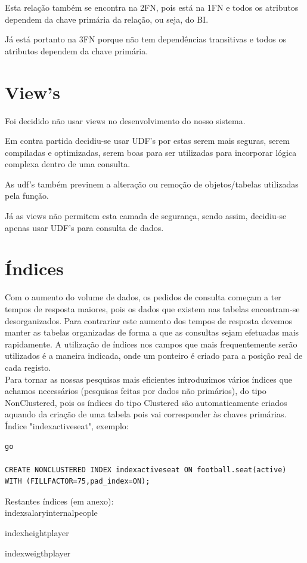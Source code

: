 \documentclass[pdftex,12pt,a4paper]{report}
\begin{document}
Esta relação também se encontra na 2FN, pois está na 1FN e todos os atributos dependem da chave primária da relação, ou seja, do BI.

Já está portanto na 3FN porque não tem dependências transitivas e todos os atributos dependem da chave primária.

\section{View's}
Foi decidido não usar views no desenvolvimento do nosso sistema. 

Em contra partida decidiu-se usar UDF's por estas serem mais seguras, serem compiladas e optimizadas, serem boas para ser utilizadas para incorporar lógica complexa dentro de uma consulta. 

As udf's também previnem a alteração ou remoção de objetos/tabelas utilizadas pela função.

Já as views não permitem esta camada de segurança, sendo assim, decidiu-se apenas usar UDF's para consulta de dados.

\newpage
\section{Índices}
Com o aumento do volume de dados, os pedidos de consulta começam a ter tempos de resposta maiores, pois os dados que existem nas tabelas encontram-se desorganizados. Para contrariar este aumento dos tempos de resposta devemos manter as tabelas organizadas de forma a que as consultas sejam efetuadas mais rapidamente. A utilização de índices nos campos que mais frequentemente serão utilizados é a maneira indicada, onde um ponteiro é criado para a posição real de cada registo.
\\

	Para tornar as nossas pesquisas mais eficientes introduzimos vários índices que achamos necessários (pesquisas feitas por dados não primários), do tipo NonClustered, pois os índices do tipo Clustered são automaticamente criados aquando da criação de uma tabela pois vai corresponder às chaves primárias.
\\

Índice "indexactiveseat", exemplo:
\\

\begin{lstlisting}
go

CREATE NONCLUSTERED INDEX indexactiveseat ON football.seat(active)
WITH (FILLFACTOR=75,pad_index=ON);
\end{lstlisting}
 \vspace{0,5in}
Restantes índices (em anexo):
\\

indexsalaryinternalpeople

indexheightplayer

indexweigthplayer
\end{document}
